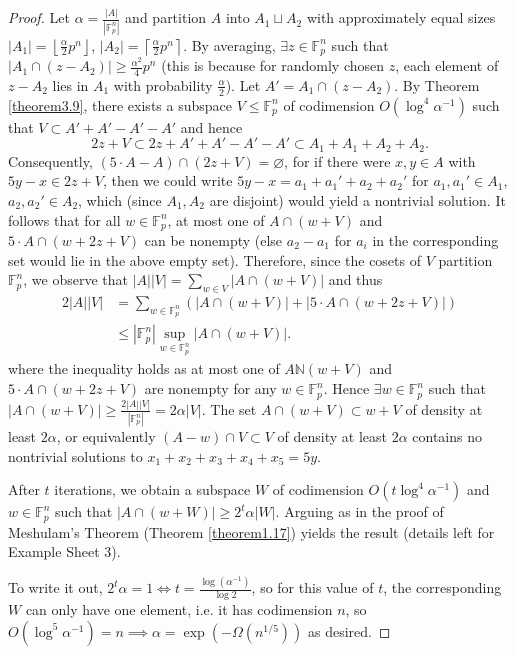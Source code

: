 \documentclass{article}
\theoremstyle{definition}
\begin{document}
\begin{proof}
    Let $\alpha = \frac{\left|A\right|}{\left|\mathbb{F}_p^n\right|}$ and partition $A$ into $A_1 \sqcup A_2$ with approximately equal sizes $\left|A_1\right| = \left\lfloor \frac{\alpha}{2} p^n \right\rfloor$, $\left|A_2\right| = \left\lceil \frac{\alpha}{2}p^n \right\rceil$. By averaging, $\exists z \in \mathbb{F}_p^n$ such that $\left|A_1 \cap (z-A_2)\right| \ge \frac{\alpha^2}{4}p^n$ (this is because for randomly chosen $z$, each element of $z-A_2$ lies in $A_1$ with probability $\frac{\alpha}{2}$). Let $A' = A_1 \cap (z-A_2)$. By Theorem \ref{theorem3.9}, there exists a subspace $V\le \mathbb{F}_p^n$ of codimension $O(\log^4 \alpha^{-1})$ such that $V \subset A'+A'-A'-A'$ and hence $$2z + V \subset 2z + A' + A' - A' - A' \subset A_1 + A_1 + A_2 + A_2.$$ Consequently, $(5 \cdot A - A) \cap (2z + V) = \varnothing$, for if there were $x,y \in A$ with $5y-x \in 2z + V$, then we could write $5y - x = a_1 + a_1' + a_2 + a_2'$ for $a_1,a_1' \in A_1$, $a_2,a_2' \in A_2$, which (since $A_1, A_2$ are disjoint) would yield a nontrivial solution. It follows that for all $w \in \mathbb{F}_p^n$, at most one of $A \cap (w+V)$ and $5\cdot A \cap (w+2z+V)$ can be nonempty (else $a_2-a_1$ for $a_i$ in the corresponding set would lie in the above empty set). Therefore, since the cosets of $V$ partition $\mathbb{F}_p^n$, we observe that $\left|A\right|\left|V\right|=\sum_{w \in V}^{} \left|A \cap (w+V)\right|$ and thus
    \begin{align*}
        2\left|A\right|\left|V\right| &= \sum_{w \in \mathbb{F}_p^n}^{} \left(\left|A \cap (w + V)\right| + \left|5\cdot A \cap (w+2z + V)\right|\right) \\
        &\le \left|\mathbb{F}_p^n\right| \sup_{w \in \mathbb{F}_p^n} \left|A \cap (w +V)\right|.
    \end{align*} 
    where the inequality holds as at most one of $A \mathbb{N} (w+V)$ and $5\cdot A \cap (w+2z+V)$ are nonempty for any $w \in \mathbb{F}_p^n$. Hence $\exists w \in \mathbb{F}_p^n$ such that $\left|A \cap(w+V)\right| \ge \frac{2\left|A\right|\left|V\right|}{\left|\mathbb{F}_p^n\right|} = 2\alpha\left|V\right|$. The set $A \cap (w +V) \subset w + V$ of density at least $2\alpha$, or equivalently $(A-w)\cap V \subset V$ of density at least $2\alpha$ contains no nontrivial solutions to $x_1+x_2+x_3+x_4+x_5=5y$. 
    
    \vspace{1mm}
     
    After $t$ iterations, we obtain a subspace $W$ of codimension $O(t \log^4 \alpha^{-1})$ and $w \in \mathbb{F}_p^n$ such that $\left|A \cap (w+W)\right| \ge 2^t \alpha \left|W\right|$. Arguing as in the proof of Meshulam's Theorem (Theorem \ref{theorem1.17}) yields the result (details left for Example Sheet 3).
    \vspace{1mm}
     
    To write it out, $2^t \alpha = 1 \iff t = \frac{\log(\alpha^{-1})}{\log 2}$, so for this value of $t$, the corresponding $W$ can only have one element, i.e. it has codimension $n$, so $O(\log^5 \alpha^{-1}) = n \implies \alpha = \exp \left(-\Omega(n^{1/5})\right)$ as desired.
\end{proof}
\end{document}
